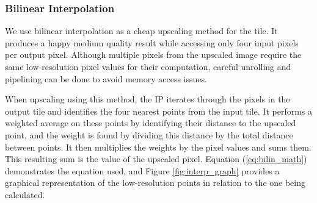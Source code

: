 \documentclass{article}
\newcounter{subsubsubsection}[subsubsection]
\begin{document}
            \begin{table}[h]
            \centering
            \caption{Resource utilization comparison between floating-point and constant integer multiplications for the ZCU102 board.}
            \label{tab:multiplication_utilization}
            \end{table}


            
        \subsubsection{Bilinear Interpolation}
                \noindent We use bilinear interpolation as a cheap upscaling method for the tile. It produces a happy medium quality result while accessing only four input pixels per output pixel. Although multiple pixels from the upscaled image require the same low-resolution pixel values for their computation, careful unrolling and pipelining can be done to avoid memory access issues.
                \par When upscaling using this method, the IP iterates through the pixels in the output tile and identifies the four nearest points from the input tile. It performs a weighted average on these points by identifying their distance to the upscaled point, and the weight is found by dividing this distance by the total distance between points. It then multiplies the weights by the pixel values and sums them. This resulting sum is the value of the upscaled pixel. Equation (\ref{eq:bilin_math}) demonstrates the equation used, and Figure \ref{fig:interp_graph} provides a graphical representation of the low-resolution points in relation to the one being calculated. 
\end{document}
